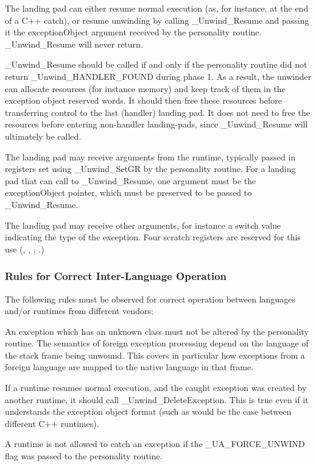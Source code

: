 The landing pad can either resume normal execution (as, for instance, at
the end of a C++ catch), or resume unwinding by calling \_Unwind\_Resume and
passing it the exceptionObject argument received by the personality routine. 
\_Unwind\_Resume will never return. 

\_Unwind\_Resume should be called if and only if the personality routine 
did not return \_Unwind\_HANDLER\_FOUND during phase 1.  As a result, 
the unwinder can allocate resources (for instance memory) and keep track 
of them in the exception object reserved words. It should then free these 
resources before transferring control to the last (handler) landing pad. 
It does not need to free the resources before entering non-handler 
landing-pads, since \_Unwind\_Resume will ultimately be called. 

The landing pad may receive arguments from the runtime, typically passed 
in registers set using \_Unwind\_SetGR by the personality routine. 
For a landing pad that can call to \_Unwind\_Resume, one argument must 
be the exceptionObject pointer, which must be preserved to be passed to 
\_Unwind\_Resume. 

The landing pad may receive other arguments, for instance a switch value 
indicating the type of the exception. Four scratch registers are reserved 
for this use (\RDI, \RSI, \RDX, \RCX.) 

\subsubsection{Rules for Correct Inter-Language Operation}

The following rules must be observed for correct operation between
languages and/or runtimes from different vendors:

An exception which has an unknown class must not be altered by the 
personality routine. The semantics of foreign exception processing
depend on the language of the stack frame being unwound. This covers 
in particular how exceptions from a foreign language are mapped to
the native language in that frame. 

If a runtime resumes normal execution, and the caught exception was 
created by another runtime, it should call \_Unwind\_DeleteException. 
This is true even if it understands the exception object format 
(such as would be the case between different C++ runtimes). 

A runtime is not allowed to catch an exception if the 
\_UA\_FORCE\_UNWIND flag was passed to the personality routine. 

